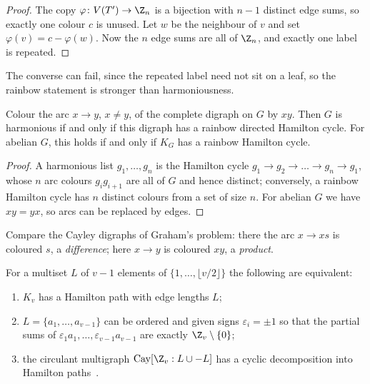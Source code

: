 \begin{proof}
The copy $\varphi\colon V(T')\to\Z_n$ is a bijection with $n-1$ distinct edge sums, so exactly one colour $c$ is unused. Let $w$ be the neighbour of $v$ and set $\varphi(v)=c-\varphi(w)$. Now the $n$ edge sums are all of $\Z_n$, and exactly one label is repeated.
\end{proof}

The converse can fail, since the repeated label need not sit on a leaf, so the rainbow statement is stronger than harmoniousness.

\begin{proposition}\label{prop:hgroup}
Colour the arc $x\to y$, $x\neq y$, of the complete digraph on $G$ by $xy$. Then $G$ is harmonious if and only if this digraph has a rainbow directed Hamilton cycle. For abelian $G$, this holds if and only if $K_G$ has a rainbow Hamilton cycle.
\end{proposition}

\begin{proof}
A harmonious list $g_1,\dots,g_n$ is the Hamilton cycle $g_1\to g_2\to\dots\to g_n\to g_1$, whose $n$ arc colours $g_ig_{i+1}$ are all of $G$ and hence distinct; conversely, a rainbow Hamilton cycle has $n$ distinct colours from a set of size $n$. For abelian $G$ we have $xy=yx$, so arcs can be replaced by edges.
\end{proof}

Compare the Cayley digraphs of Graham's problem: there the arc $x\to xs$ is coloured $s$, a \emph{difference}; here $x\to y$ is coloured $xy$, a \emph{product}.

\begin{proposition}\label{prop:bhr}
For a multiset $L$ of $v-1$ elements of $\{1,\dots,\lfloor v/2\rfloor\}$ the following are equivalent:
\begin{enumerate}
\item $K_v$ has a Hamilton path with edge lengths $L$;
\item $L=\{a_1,\dots,a_{v-1}\}$ can be ordered and given signs $\varepsilon_i=\pm1$ so that the partial sums of $\varepsilon_1a_1,\dots,\varepsilon_{v-1}a_{v-1}$ are exactly $\Z_v\setminus\{0\}$;
\item the circulant multigraph $\operatorname{Cay}[\Z_v:L\cup-L]$ has a cyclic decomposition into Hamilton paths~\cite{pp14}.
\end{enumerate}
\end{proposition}


